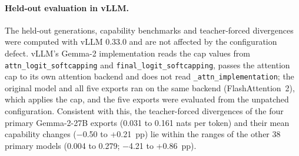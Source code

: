\paragraph{Held-out evaluation in vLLM.} The held-out generations, capability
benchmarks and teacher-forced divergences were computed with vLLM 0.33.0 and
are not affected by the configuration defect. vLLM's Gemma-2 implementation
reads the cap values from \texttt{attn\_logit\_softcapping} and
\texttt{final\_logit\_softcapping}, passes the attention cap to its own
attention backend and does not read \texttt{\_attn\_implementation}; the
original model and all five exports ran on the same backend (FlashAttention~2),
which applies the cap, and the five exports were evaluated from the unpatched
configuration. Consistent with this, the teacher-forced divergences of the four
primary Gemma-2-27B exports (0.031 to 0.161 nats per token) and their mean
capability changes ($-$0.50 to +0.21~pp) lie within the ranges of the other 38
primary models (0.004 to 0.279; $-$4.21 to +0.86~pp).

